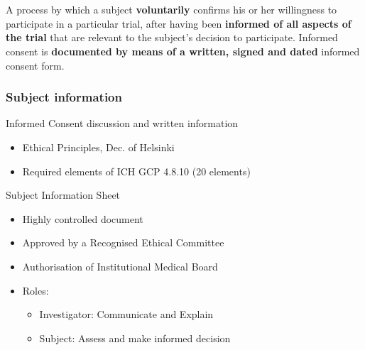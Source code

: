 \documentclass[xcolor=dvipsnames]{beamer}
\begin{document}
\begin{frame}
	\frametitle{\insertsection ~ {\scriptsize\cite{informedconsentWHO,dittrich2015esmod}}}
	
	A process by which a subject {\bf voluntarily} confirms his or her willingness to participate 
	in  a  particular  trial,  after  having  been  {\bf informed  of  all  aspects  of  the  
	trial}  that  are relevant  to  the  subject's  decision  to  participate.  Informed  
	consent  is  {\bf documented  by means of a written, signed and dated} informed consent form.
	
	\hspace{9cm}{\em ICH GCP 1.28}
	\vskip 0.5cm
	
\end{frame}

\begin{frame}
	\frametitle{Subject information}

	\begin{block}{Informed Consent discussion and written information}
	\begin{itemize}
	\item Ethical Principles, Dec. of Helsinki
	\item Required elements of ICH GCP 4.8.10 (20 elements) {\scriptsize\cite{ICH1996GCP}}
	\end{itemize}
	\end{block}	
	
	\begin{block}{Subject Information Sheet}
	\begin{itemize}
	\item Highly controlled document
	\item Approved by a Recognised Ethical Committee
	\item Authorisation of Institutional Medical Board
	\item Roles:
	\begin{itemize}
		\item Investigator: Communicate and Explain
		\item Subject: Assess and make informed decision
	\end{itemize}
	\end{itemize}
	\end{block}	
\end{frame}
\end{document}
